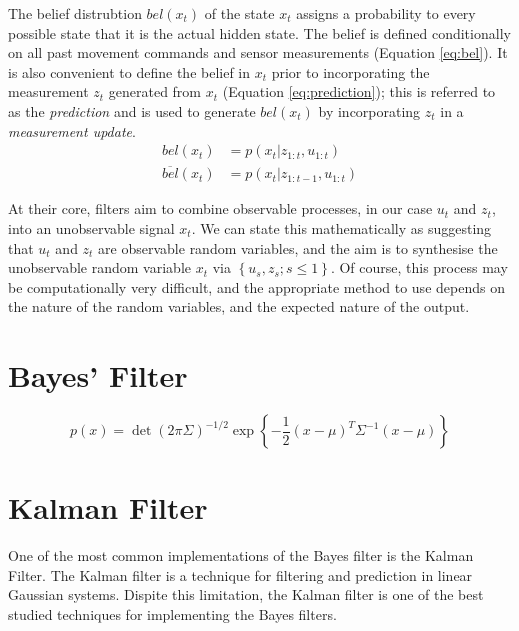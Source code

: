 \documentclass[english]{article}
\begin{document}
The belief distrubtion $bel(x_t)$ of the state $x_t$ assigns a probability to every possible state that it is the actual hidden state. The belief is defined conditionally on all past movement commands and sensor measurements (Equation \ref{eq:bel}). It is also convenient to define the belief in $x_t$ prior to incorporating the measurement $z_t$ generated from $x_t$ (Equation \ref{eq:prediction}); this is referred to as the \emph{prediction} and is used to generate $bel(x_t)$ by incorporating $z_t$ in a \emph{measurement update}.
\begin {align}
  bel(x_t) & = p(x_t | z_{1:t},u_{1:t}) \label{eq:bel} \\   
  \overline{bel}(x_t) & = p(x_t | z_{1:t-1}, u_{1:t}) \label{eq:prediction}
\end {align}

At their core, filters aim to combine observable processes, in our case $u_t$ and $z_t$, into an unobservable signal $x_t$. We can state this mathematically as suggesting that $u_t$ and $z_t$ are observable random variables, and the aim is to synthesise the unobservable random variable $x_t$ via $\left\{u_s,z_s; s \le 1\right\}$. Of course, this process may be computationally very difficult, and the appropriate method to use depends on the nature of the random variables, and the expected nature of the output.

\section*{Bayes' Filter}

\begin{equation}
\label{eq:mvarnormal}
p(x) = \det(2 \pi \Sigma)^{-1/2} \exp\left\{-\frac{1}{2}(x-\mu)^T \Sigma^{-1}(x-\mu)\right\}
\end{equation}

\section*{Kalman Filter}

One of the most common implementations of the Bayes filter is the Kalman Filter. The Kalman filter is a technique for filtering and prediction in linear Gaussian systems. Dispite this limitation, the Kalman filter is one of the best studied techniques for implementing the Bayes filters.
\end{document}

